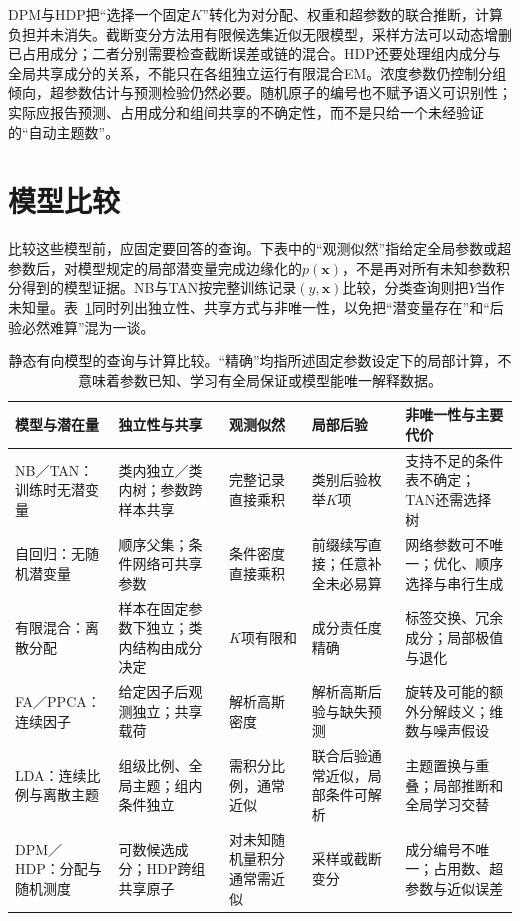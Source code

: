 DPM与HDP把“选择一个固定$K$”转化为对分配、权重和超参数的联合推断，计算负担并未消失。截断变分方法用有限候选集近似无限模型，采样方法可以动态增删已占用成分；二者分别需要检查截断误差或链的混合。HDP还要处理组内成分与全局共享成分的关系，不能只在各组独立运行有限混合EM。浓度参数仍控制分组倾向，超参数估计与预测检验仍然必要。随机原子的编号也不赋予语义可识别性；实际应报告预测、占用成分和组间共享的不确定性，而不是只给一个未经验证的“自动主题数”。

\section{模型比较}
\label{sec:pgm-static-directed-comparison}

比较这些模型前，应固定要回答的查询。下表中的“观测似然”指给定全局参数或超参数后，对模型规定的局部潜变量完成边缘化的$p(\bm{x})$，不是再对所有未知参数积分得到的模型证据。NB与TAN按完整训练记录$(y,\bm{x})$比较，分类查询则把$Y$当作未知量。表~\ref{tab:pgm-static-directed-comparison}同时列出独立性、共享方式与非唯一性，以免把“潜变量存在”和“后验必然难算”混为一谈。

\begin{table}[htbp]
  \centering
  \small
  \begin{tabularx}{\linewidth}{@{}p{21mm}XXXX@{}}
    \toprule
    模型与潜在量 & 独立性与共享 & 观测似然 & 局部后验 & 非唯一性与主要代价\\
    \midrule
    NB／TAN：训练时无潜变量 &
    类内独立／类内树；参数跨样本共享 &
    完整记录直接乘积 &
    类别后验枚举$K$项 &
    支持不足的条件表不确定；TAN还需选择树\\
    自回归：无随机潜变量 &
    顺序父集；条件网络可共享参数 &
    条件密度直接乘积 &
    前缀续写直接；任意补全未必易算 &
    网络参数可不唯一；优化、顺序选择与串行生成\\
    有限混合：离散分配 &
    样本在固定参数下独立；类内结构由成分决定 &
    $K$项有限和 &
    成分责任度精确 &
    标签交换、冗余成分；局部极值与退化\\
    FA／PPCA：连续因子 &
    给定因子后观测独立；共享载荷 &
    解析高斯密度 &
    解析高斯后验与缺失预测 &
    旋转及可能的额外分解歧义；维数与噪声假设\\
    LDA：连续比例与离散主题 &
    组级比例、全局主题；组内条件独立 &
    需积分比例，通常近似 &
    联合后验通常近似，局部条件可解析 &
    主题置换与重叠；局部推断和全局学习交替\\
    DPM／HDP：分配与随机测度 &
    可数候选成分；HDP跨组共享原子 &
    对未知随机量积分通常需近似 &
    采样或截断变分 &
    成分编号不唯一；占用数、超参数与近似误差\\
    \bottomrule
  \end{tabularx}
  \caption{静态有向模型的查询与计算比较。“精确”均指所述固定参数设定下的局部计算，不意味着参数已知、学习有全局保证或模型能唯一解释数据。}
  \label{tab:pgm-static-directed-comparison}
\end{table}

